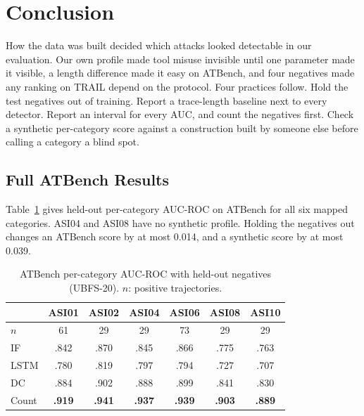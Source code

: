 \documentclass[conference]{IEEEtran}
\begin{document}
\section{Conclusion}

How the data was built decided which attacks looked detectable in our evaluation. Our own profile made tool misuse invisible until one parameter made it visible, a length difference made it easy on ATBench, and four negatives made any ranking on TRAIL depend on the protocol. Four practices follow. Hold the test negatives out of training. Report a trace-length baseline next to every detector. Report an interval for every AUC, and count the negatives first. Check a synthetic per-category score against a construction built by someone else before calling a category a blind spot.




\appendix

\subsection{Full ATBench Results}
\label{app:atbench}

Table~\ref{tab:atbench} gives held-out per-category AUC-ROC on ATBench for all six mapped categories. ASI04 and ASI08 have no synthetic profile. Holding the negatives out changes an ATBench score by at most 0.014, and a synthetic score by at most 0.039.

\begin{table}[h]
\caption{ATBench per-category AUC-ROC with held-out negatives (UBFS-20). $n$: positive trajectories.}
\label{tab:atbench}
\centering
\footnotesize
\setlength{\tabcolsep}{3.5pt}
\begin{tabular}{@{}lcccccc@{}}
\toprule
& ASI01 & ASI02 & ASI04 & ASI06 & ASI08 & ASI10 \\
\midrule
$n$ & 61 & 29 & 29 & 73 & 29 & 29 \\
IF & .842 & .870 & .845 & .866 & .775 & .763 \\
LSTM & .780 & .819 & .797 & .794 & .727 & .707 \\
DC & .884 & .902 & .888 & .899 & .841 & .830 \\
Count & \textbf{.919} & \textbf{.941} & \textbf{.937} & \textbf{.939} & \textbf{.903} & \textbf{.889} \\
\bottomrule
\end{tabular}
\end{table}
\end{document}
